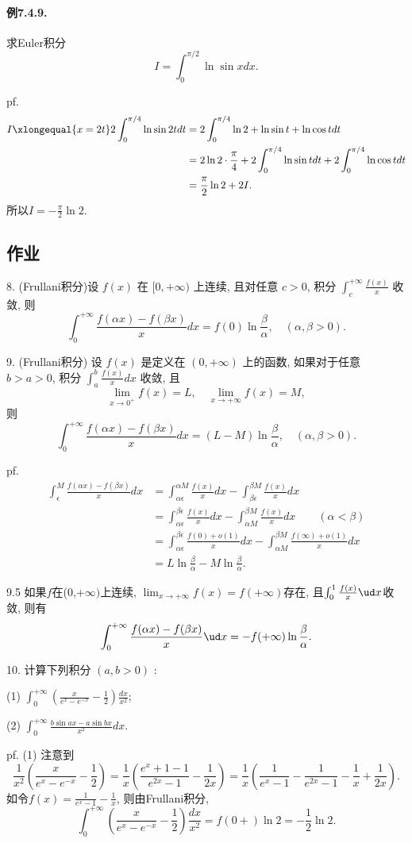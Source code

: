 \paragraph{例7.4.9.}

求Euler积分
\[
I=\int_{0}^{\pi/2}\ln\sin xdx.
\]

pf.
\begin{align*}
	I\xlongequal{x=2t}2\int_{0}^{\pi/4}\ln\sin2tdt & =2\int_{0}^{\pi/4}\ln2+\ln\sin t+\ln\cos tdt\\
	& =2\ln2\cdot\frac{\pi}{4}+2\int_{0}^{\pi/4}\ln\sin tdt+2\int_{0}^{\pi/4}\ln\cos tdt\\
	& =\frac{\pi}{2}\ln2+2I.
\end{align*}
所以$I=-\frac{\pi}{2}\ln2$.

\subsection{作业}

8. (Frullani积分)设 $f(x)$ 在 $[0,+\infty)$ 上连续, 且对任意 $c>0$, 积分 $\int_{c}^{+\infty}\frac{f(x)}{x}$
收敛, 则 
\[
\int_{0}^{+\infty}\frac{f(\alpha x)-f(\beta x)}{x}dx=f(0)\ln\frac{\beta}{\alpha},\quad(\alpha,\beta>0).
\]

9. (Frullani积分) 设 $f(x)$ 是定义在 $(0,+\infty)$ 上的函数, 如果对于任意 $b>a>0$,
积分 $\int_{a}^{b}\frac{f(x)}{x}dx$ 收敛, 且 
\[
\lim_{x\rightarrow0^{+}}f(x)=L,\quad\lim_{x\rightarrow+\infty}f(x)=M,
\]
则 
\[
\int_{0}^{+\infty}\frac{f(\alpha x)-f(\beta x)}{x}dx=(L-M)\ln\frac{\beta}{\alpha},\quad(\alpha,\beta>0).
\]

pf. 
\begin{align*}
	\int_{\epsilon}^{M}\frac{f(\alpha x)-f(\beta x)}{x}dx & =\int_{\alpha\epsilon}^{\alpha M}\frac{f(x)}{x}dx-\int_{\beta\epsilon}^{\beta M}\frac{f(x)}{x}dx\\
	& =\int_{\alpha\epsilon}^{\beta\epsilon}\frac{f(x)}{x}dx-\int_{\alpha M}^{\beta M}\frac{f(x)}{x}dx\qquad(\alpha<\beta)\\
	& =\int_{\alpha\epsilon}^{\beta\epsilon}\frac{f(0)+o(1)}{x}dx-\int_{\alpha M}^{\beta M}\frac{f(\infty)+o(1)}{x}dx\\
	& =L\ln\frac{\beta}{\alpha}-M\ln\frac{\beta}{\alpha}.
\end{align*}

9.5 如果$f$在(0,+$\infty)$上连续, $\lim_{x\to+\infty}f(x)=f(+\infty)$存在,
且$\int_{0}^{1}\frac{f(x)}{x}\ud x$收敛, 则有
\[
\int_{0}^{+\infty}\frac{f(\alpha x)-f(\beta x)}{x}\ud x=-f(+\infty)\ln\frac{\beta}{\alpha}.
\]

10. 计算下列积分 $(a,b>0)$ : 

(1) $\int_{0}^{+\infty}\left(\frac{x}{e^{x}-e^{-x}}-\frac{1}{2}\right)\frac{dx}{x^{2}}$; 

(2) $\int_{0}^{+\infty}\frac{b\sin ax-a\sin bx}{x^{2}}dx$.

pf. (1) 注意到
\[
\frac{1}{x^{2}}\left(\frac{x}{e^{x}-e^{-x}}-\frac{1}{2}\right)=\frac{1}{x}\left(\frac{e^{x}+1-1}{e^{2x}-1}-\frac{1}{2x}\right)=\frac{1}{x}\left(\frac{1}{e^{x}-1}-\frac{1}{e^{2x}-1}-\frac{1}{x}+\frac{1}{2x}\right).
\]
如令$f(x)=\frac{1}{e^{x}-1}-\frac{1}{x}$, 则由Frullani积分, 
\[
\int_{0}^{+\infty}\left(\frac{x}{e^{x}-e^{-x}}-\frac{1}{2}\right)\frac{dx}{x^{2}}=f(0+)\ln2=-\frac{1}{2}\ln2.
\]